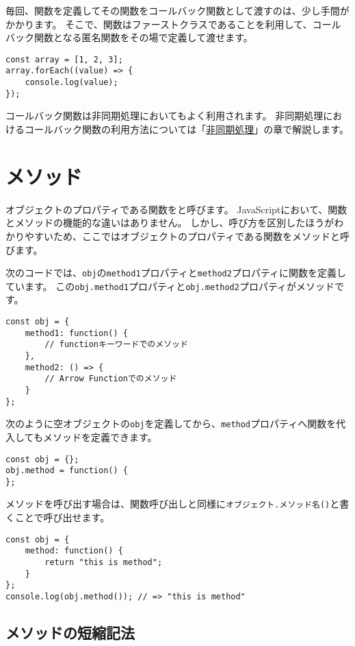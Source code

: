 毎回、関数を定義してその関数をコールバック関数として渡すのは、少し手間がかかります。
そこで、関数はファーストクラスであることを利用して、コールバック関数となる匿名関数をその場で定義して渡せます。

\begin{lstlisting}
const array = [1, 2, 3];
array.forEach((value) => {
    console.log(value);
});
\end{lstlisting}

コールバック関数は非同期処理においてもよく利用されます。
非同期処理におけるコールバック関数の利用方法については「\hyperlink{async-handling}{非同期処理}」の章で解説します。

\hypertarget{method}{%
\section{メソッド}\label{method}}

オブジェクトのプロパティである関数を\textbf{}と呼びます。
JavaScriptにおいて、関数とメソッドの機能的な違いはありません。
しかし、呼び方を区別したほうがわかりやすいため、ここではオブジェクトのプロパティである関数をメソッドと呼びます。

次のコードでは、\texttt{obj}の\texttt{method1}プロパティと\texttt{method2}プロパティに関数を定義しています。
この\texttt{obj.method1}プロパティと\texttt{obj.method2}プロパティがメソッドです。

\begin{lstlisting}
const obj = {
    method1: function() {
        // functionキーワードでのメソッド
    },
    method2: () => {
        // Arrow Functionでのメソッド
    }
};
\end{lstlisting}

次のように空オブジェクトの\texttt{obj}を定義してから、\texttt{method}プロパティへ関数を代入してもメソッドを定義できます。

\begin{lstlisting}
const obj = {};
obj.method = function() {
};
\end{lstlisting}

メソッドを呼び出す場合は、関数呼び出しと同様に\texttt{オブジェクト.メソッド名()}と書くことで呼び出せます。

\begin{lstlisting}
const obj = {
    method: function() {
        return "this is method";
    }
};
console.log(obj.method()); // => "this is method"
\end{lstlisting}

\hypertarget{shorthand-for-method}{%
\subsection{メソッドの短縮記法\protect{}}\label{shorthand-for-method}}

